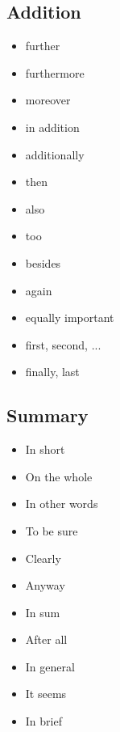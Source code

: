 \subsection{Addition}
\begin{itemize}
    \item further
    \item furthermore
    \item moreover
    \item in addition
    \item additionally
    \item then
    \item also
    \item too
    \item besides
    \item again
    \item equally important
    \item first, second, ...
    \item finally, last
\end{itemize}

\subsection{Summary}
\begin{itemize}
    \item In short
    \item On the whole
    \item In other words
    \item To be sure
    \item Clearly
    \item Anyway
    \item In sum
    \item After all
    \item In general
    \item It seems
    \item In brief
\end{itemize}

